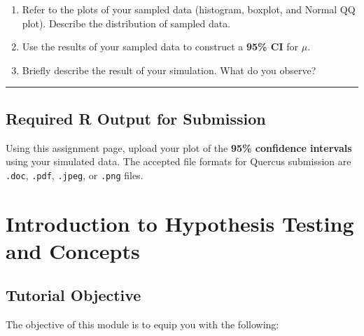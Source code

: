 \documentclass[oneside,openany]{book}
\begin{document}
\begin{enumerate}
\def\labelenumi{\arabic{enumi}.}
\item
  Refer to the plots of your sampled data (histogram, boxplot, and Normal QQ plot). Describe the distribution of sampled data.
\item
  Use the results of your sampled data to construct a \textbf{95\% CI} for \(\mu\).
\item
  Briefly describe the result of your simulation. What do you observe?
\end{enumerate}

\begin{center}\rule{0.5\linewidth}{0.5pt}\end{center}

\section{Required R Output for Submission}\label{required-r-output-for-submission-1}

Using this assignment page, upload your plot of the \textbf{95\% confidence intervals} using your simulated data. The accepted file formats for Quercus submission are \texttt{.doc}, \texttt{.pdf}, \texttt{.jpeg}, or \texttt{.png} files.

\chapter{Introduction to Hypothesis Testing and Concepts}\label{activity-6---introduction-to-hypothesis-testing-and-concepts}

\section{Tutorial Objective}\label{tutorial-objective-3}

The objective of this module is to equip you with the following:
\end{document}
